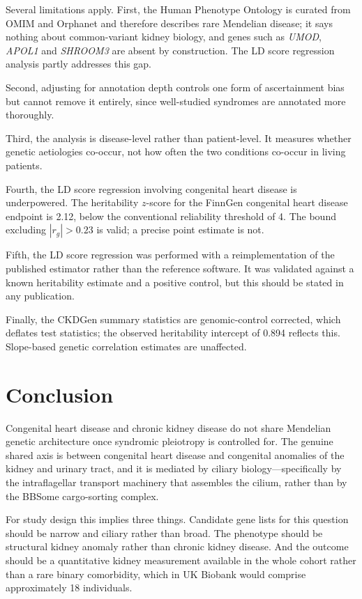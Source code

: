 \documentclass[11pt,a4paper]{article}
\newcommand{\gene}[1]{\textit{#1}}
\begin{document}
Several limitations apply. First, the Human Phenotype Ontology is curated from OMIM and
Orphanet and therefore describes rare Mendelian disease; it says nothing about common-variant
kidney biology, and genes such as \gene{UMOD}, \gene{APOL1} and \gene{SHROOM3} are absent by
construction. The LD score regression analysis partly addresses this gap.

Second, adjusting for annotation depth controls one form of ascertainment bias but cannot
remove it entirely, since well-studied syndromes are annotated more thoroughly.

Third, the analysis is disease-level rather than patient-level. It measures whether genetic
aetiologies co-occur, not how often the two conditions co-occur in living patients.

Fourth, the LD score regression involving congenital heart disease is underpowered. The
heritability $z$-score for the FinnGen congenital heart disease endpoint is 2.12, below the
conventional reliability threshold of 4. The bound excluding $|r_g| > 0.23$ is valid; a
precise point estimate is not.

Fifth, the LD score regression was performed with a reimplementation of the published
estimator rather than the reference software. It was validated against a known heritability
estimate and a positive control, but this should be stated in any publication.

Finally, the CKDGen summary statistics are genomic-control corrected, which deflates test
statistics; the observed heritability intercept of 0.894 reflects this. Slope-based genetic
correlation estimates are unaffected.

\section{Conclusion}

Congenital heart disease and chronic kidney disease do not share Mendelian genetic
architecture once syndromic pleiotropy is controlled for. The genuine shared axis is between
congenital heart disease and congenital anomalies of the kidney and urinary tract, and it is
mediated by ciliary biology---specifically by the intraflagellar transport machinery that
assembles the cilium, rather than by the BBSome cargo-sorting complex.

For study design this implies three things. Candidate gene lists for this question should be
narrow and ciliary rather than broad. The phenotype should be structural kidney anomaly
rather than chronic kidney disease. And the outcome should be a quantitative kidney
measurement available in the whole cohort rather than a rare binary comorbidity, which in UK
Biobank would comprise approximately 18 individuals.
\end{document}
